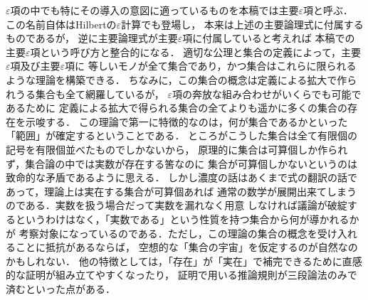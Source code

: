 	$\varepsilon$項の中でも特にその導入の意図に適っているものを本稿では主要$\varepsilon$項と呼ぶ．
	この名前自体はHilbertの$\varepsilon$計算でも登場し，
	本来は上述の主要論理式に付属するものであるが，
	逆に主要論理式が主要$\varepsilon$項に付属していると考えれば
	本稿での主要$\varepsilon$項という呼び方と整合的になる．
	適切な公理と集合の定義によって，主要$\varepsilon$項及び主要$\varepsilon$項に
	等しいモノが全て集合であり，かつ集合はこれらに限られるような理論を構築できる．
	ちなみに，この集合の概念は定義による拡大で作られうる集合も全て網羅しているが，
	$\varepsilon$項の奔放な組み合わせがいくらでも可能であるために
	定義による拡大で得られる集合の全てよりも遥かに多くの集合の存在を示唆する．
	この理論で第一に特徴的なのは，何が集合であるかといった「範囲」が確定するということである．
	ところがこうした集合は全て有限個の記号を有限個並べたものでしかないから，
	原理的に集合は可算個しか作られず，集合論の中では実数が存在する筈なのに
	集合が可算個しかないというのは致命的な矛盾であるように思える．
	しかし濃度の話はあくまで式の翻訳の話であって，理論上は実在する集合が可算個あれば
	通常の数学が展開出来てしまうのである．実数を扱う場合だって実数を漏れなく用意
	しなければ議論が破綻するというわけはなく，「実数である」という性質を持つ集合から何が導かれるかが
	考察対象になっているのである．ただし，この理論の集合の概念を受け入れることに抵抗があるならば，
	空想的な「集合の宇宙」を仮定するのが自然なのかもしれない．
	他の特徴としては，「存在」が「実在」で補完できるために直感的な証明が組み立てやすくなったり，
	証明で用いる推論規則が三段論法のみで済むといった点がある．
	
